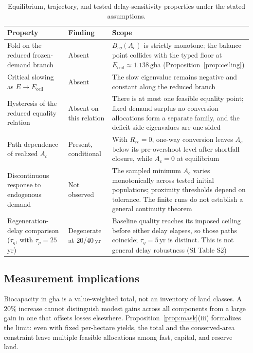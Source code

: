 \documentclass[preprint,12pt,authoryear]{elsarticle}
\newcommand{\Eceil}{E_{\mathrm{ceil}}}
\begin{document}
\begin{table}[!htbp]
\centering\footnotesize
\caption{Equilibrium, trajectory, and tested delay-sensitivity properties under the stated assumptions.}
\label{tab:neg}
\begin{tabularx}{\textwidth}{>{\raggedright\arraybackslash}p{} l >{\raggedright\arraybackslash}X}
\toprule
Property & Finding & Scope \\
\midrule
Fold on the reduced frozen-demand branch & Absent & $B_{eq}(A_c)$ is strictly monotone; the balance point collides with the typed floor at $\Eceil\approx1.138\,\mathrm{gha}$ (Proposition~\ref{prop:ceiling}) \\
Critical slowing as $E\to\Eceil$ & Absent & The slow eigenvalue remains negative and constant along the reduced branch \\
Hysteresis of the reduced equality relation & Absent on this relation & There is at most one feasible equality point; fixed-demand surplus no-conversion allocations form a separate family, and the deficit-side eigenvalues are one-sided \\
Path dependence of realized $A_c$ & Present, conditional & With $R_{rc}=0$, one-way conversion leaves $A_c$ below its pre-overshoot level after shortfall closure, while $\dot A_c=0$ at equilibrium \\
Discontinuous response to endogenous demand & Not observed & The sampled minimum $A_c$ varies monotonically across tested initial populations; proximity thresholds depend on tolerance. The finite runs do not establish a general continuity theorem \\
Regeneration-delay comparison ($\tau_g$, with $\tau_p=25$\,yr) & Degenerate at 20/40\,yr & Baseline quality reaches its imposed ceiling before either delay elapses, so those paths coincide; $\tau_g=5$\,yr is distinct. This is not general delay robustness (SI Table S2) \\
\bottomrule
\end{tabularx}
\end{table}
\clearpage

\subsection{Measurement implications}

Biocapacity in gha is a value-weighted total, not an inventory of land classes. A $20\%$ increase cannot distinguish modest gains across all components from a large gain in one that offsets losses elsewhere. Proposition~\ref{prop:mask}(iii) formalizes the limit: even with fixed per-hectare yields, the total and the conserved-area constraint leave multiple feasible allocations among fast, capital, and reserve land.
\end{document}
